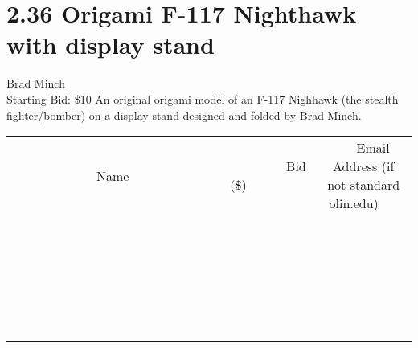 \documentclass[11pt]{article}
\begin{document}
\section*{2.36 Origami F-117 Nighthawk with display stand}
Brad Minch
\\
Starting Bid: \$10
\newline
An original origami model of an F-117 Nighhawk (the stealth fighter/bomber) on a display stand designed and folded by Brad Minch.
\\[6ex]
\begin{tabular}{c c c}
~~~~~~~~~~~~~Name~~~~~~~~~~~~~ & ~~~~~~~~~Bid (\$)~~~~~~~~~  & ~~~Email Address (if not standard olin.edu)~~~\\
 & & \\
\hline
 & & \\
\hline
 & & \\
\hline
 & & \\
\hline
 & & \\
\hline
 & & \\
\hline
 & & \\
\hline
 & & \\
\hline
 & & \\
\hline
 & & \\
\hline
 & & \\
\hline
 & & \\
\hline
 & & \\
\hline
 & & \\
\hline
 & & \\
\hline
 & & \\
\hline
 & & \\
\hline
 & & \\
\hline
 & & \\
\hline
 & & \\
\hline
 & & \\
\hline
 & & \\
\hline
 & & \\
\hline
 & & \\
\hline
 & & \\
\hline
 & & \\
\hline
\end{tabular}
\newpage
\end{document}
